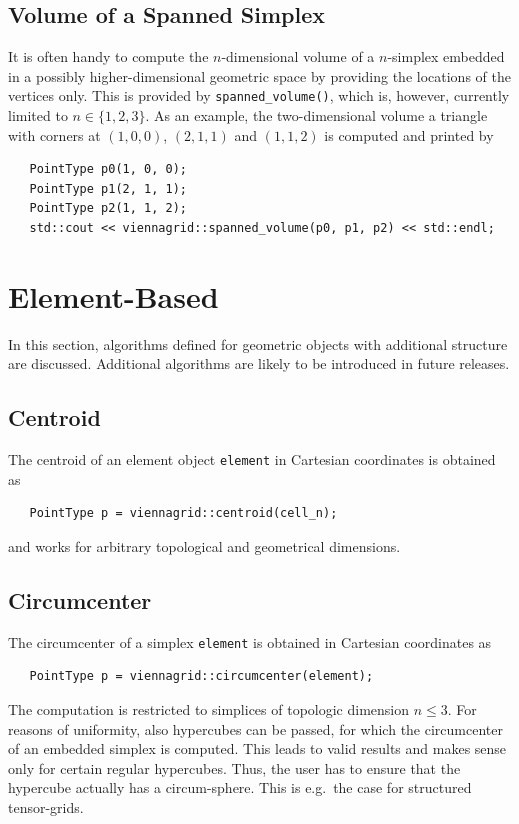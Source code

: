   \subsection{Volume of a Spanned Simplex}
  It is often handy to compute the $n$-dimensional volume of a $n$-simplex embedded in a possibly higher-dimensional geometric space by providing the locations of the vertices only.
  This is provided by \lstinline|spanned_volume()|, which is, however, currently limited to $n \in \{1, 2, 3\}$.
  As an example, the two-dimensional volume a triangle with corners at $(1, 0, 0)$, $(2, 1, 1)$ and $(1, 1, 2)$ is computed and printed by
  \begin{lstlisting}
   PointType p0(1, 0, 0);
   PointType p1(2, 1, 1);
   PointType p2(1, 1, 2);
   std::cout << viennagrid::spanned_volume(p0, p1, p2) << std::endl;
  \end{lstlisting}



\section{Element-Based}
In this section, algorithms defined for geometric objects with additional structure are discussed. Additional algorithms are likely to be introduced in future releases.

  \subsection{Centroid}
  The centroid of an element object \lstinline|element| in Cartesian coordinates is obtained as
  \begin{lstlisting}
   PointType p = viennagrid::centroid(cell_n);
  \end{lstlisting}
  and works for arbitrary topological and geometrical dimensions.

  \subsection{Circumcenter}
  The circumcenter of a simplex \lstinline|element| is obtained in Cartesian coordinates as
  \begin{lstlisting}
   PointType p = viennagrid::circumcenter(element);
  \end{lstlisting}
  The computation is restricted to simplices of topologic dimension $n \leq 3$. For reasons of uniformity, also hypercubes can be passed, for which the circumcenter of an embedded simplex is computed. This leads to valid results and makes sense only for certain regular hypercubes.
  Thus, the user has to ensure that the hypercube actually has a circum-sphere. This is e.g.~the case for structured tensor-grids.

